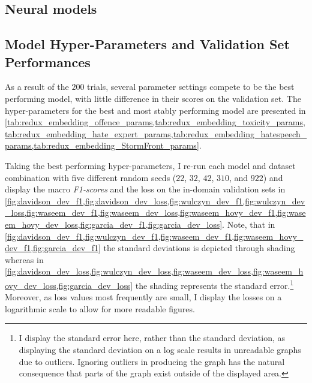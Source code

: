 \subsection{Neural models}
\subsection{Model Hyper-Parameters and Validation Set Performances}
As a result of the $200$ trials, several parameter settings compete to be the best performing model, with little difference in their scores on the validation set.
The hyper-parameters for the best and most stably performing model are presented in \cref{tab:redux_embedding_offence_params,tab:redux_embedding_toxicity_params,tab:redux_embedding_hate_expert_params,tab:redux_embedding_hatespeech_params,tab:redux_embedding_StormFront_params}.

Taking the best performing hyper-parameters, I re-run each model and dataset combination with five different random seeds ($22$, $32$, $42$, $310$, and $922$) and display the macro \textit{F1-scores} and the loss on the in-domain validation sets in \cref{fig:davidson_dev_f1,fig:davidson_dev_loss,fig:wulczyn_dev_f1,fig:wulczyn_dev_loss,fig:waseem_dev_f1,fig:waseem_dev_loss,fig:waseem_hovy_dev_f1,fig:waseem_hovy_dev_loss,fig:garcia_dev_f1,fig:garcia_dev_loss}.
Note, that in \cref{fig:davidson_dev_f1,fig:wulczyn_dev_f1,fig:waseem_dev_f1,fig:waseem_hovy_dev_f1,fig:garcia_dev_f1} the standard deviations is depicted through shading whereas in \cref{fig:davidson_dev_loss,fig:wulczyn_dev_loss,fig:waseem_dev_loss,fig:waseem_hovy_dev_loss,fig:garcia_dev_loss} the shading represents the standard error.\footnote{I display the standard error here, rather than the standard deviation, as displaying the standard deviation on a log scale results in unreadable graphs due to outliers. Ignoring outliers in producing the graph has the natural consequence that parts of the graph exist outside of the displayed area.}
Moreover, as loss values most frequently are small, I display the losses on a logarithmic scale to allow for more readable figures.

